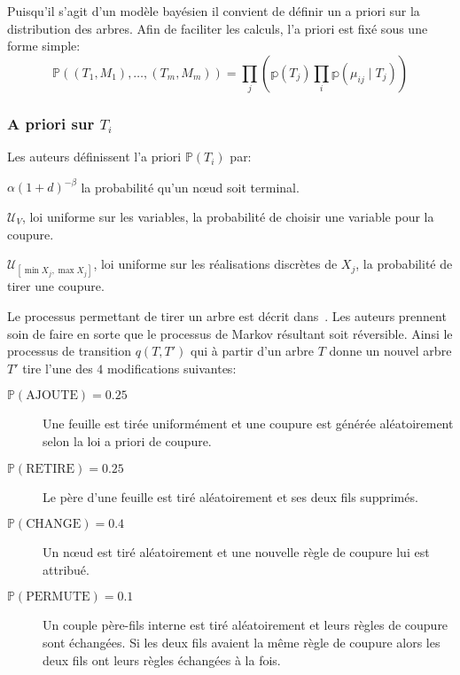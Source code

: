 Puisqu'il s'agit d'un modèle bayésien il convient de définir un a priori sur la distribution des arbres. Afin de faciliter les calculs, l'a priori est fixé sous une forme simple:
\begin{equation*}
    \mathbb{P} \left( (T_1,M_1),\dotsc,(T_m,M_m) \right) = \prod_j \left( \mathbb{p}(T_j) \prod_i \mathbb{p}(\mu_{ij} \mid T_j )  \right)
\end{equation*}

\subsubsection{A priori sur $T_i$}

Les auteurs définissent l'a priori $\mathbb{P} ( T_i )$ par:
\begin{description}
    \item $\alpha (1+d)^{-\beta}$ la probabilité qu'un nœud soit terminal.
    \item $\mathcal{U}_{V}$, loi uniforme sur les variables, la probabilité de choisir une variable pour la coupure.
    \item $\mathcal{U}_{[\min X_j , \max X_j]}$, loi uniforme sur les réalisations discrètes de $X_j$, la probabilité de tirer une coupure.
\end{description}

Le processus permettant de tirer un arbre est décrit dans~\citet{Chipman1998}. Les auteurs prennent soin de faire en sorte que le processus de Markov résultant soit réversible. Ainsi le processus de transition $q ( T , T' )$ qui à partir d'un arbre $T$ donne un nouvel arbre $T'$ tire l'une des $4$ modifications suivantes:
\begin{description}
    \item[$\mathbb{P} (\text{AJOUTE} ) = 0.25$] Une feuille est tirée uniformément et une coupure est générée aléatoirement selon la loi a priori de coupure.
    \item[$\mathbb{P} (\text{RETIRE} ) = 0.25$] Le père d'une feuille est tiré aléatoirement et ses deux fils supprimés.
    \item[$\mathbb{P} (\text{CHANGE} ) = 0.4$] Un nœud est tiré aléatoirement et une nouvelle règle de coupure lui est attribué.
    \item[$\mathbb{P} (\text{PERMUTE} ) = 0.1$] Un couple père-fils interne est tiré aléatoirement et leurs règles de coupure sont échangées. Si les deux fils avaient la même règle de coupure alors les deux fils ont leurs règles échangées à la fois.
\end{description}

